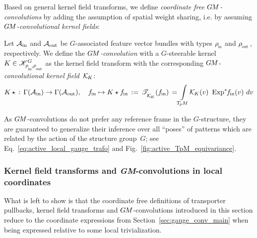 Based on general kernel field transforms, we define \emph{coordinate free $\GM$-convolutions} by adding the assumption of spatial weight sharing, i.e. by assuming $\GM$-\emph{convolutional kernel fields}:
\begin{dfn}[$\GM$-convolution]
\label{dfn:coord_free_conv}
    Let $\mathcal{A}_\textup{in}$ and $\mathcal{A}_\textup{out}$ be $G$-associated feature vector bundles with types $\rhoin$ and $\rhoout \,$, respectively.
    We define the \emph{$\GM$-convolution} with a $G$-steerable kernel $K\in\KG$ as the kernel field transform with the corresponding $\GM$-\emph{convolutional kernel field}~$\mathcal{K}_{\mkern-2mu K}$:
    \begin{align}\label{eq:coord_free_conv_def_signature}
        K\,\star\,:\, \Gamma(\Ain)\to \Gamma(\Aout), \quad
        \fin \mapsto K\star \fin \,:=\, \TKK(\fin)
        \,=\! \int\limits_{\TpM}\! \KK(v)\ \Expsfin(v)\ dv
    \end{align}
\end{dfn}
As $\GM$-convolutions do not prefer any reference frame in the $G$-structure, they are guaranteed to generalize their inference over all ``poses'' of patterns which are related by the action of the structure group~$G$; see Eq.~\eqref{eq:active_local_gauge_trafo} and Fig.~\ref{fig:active_TpM_equivariance}.












\subsubsection{Kernel field transforms and \textit{GM}-convolutions in local coordinates}
\label{sec:KFTs_GM-conv_local}

What is left to show is that the coordinate free definitions of transporter pullbacks, kernel field transforms and $\GM$-convolutions introduced in this section reduce to the coordinate expressions from Section~\ref{sec:gauge_conv_main} when being expressed relative to some local trivialization.

